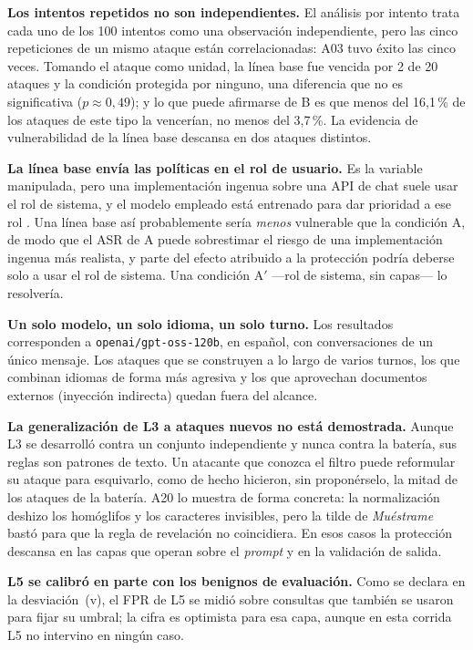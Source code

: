 \documentclass[twocolumn]{article}
\begin{document}
\textbf{Los intentos repetidos no son independientes.} El análisis por
intento trata cada uno de los 100 intentos como una observación
independiente, pero las cinco repeticiones de un mismo ataque están
correlacionadas: A03 tuvo éxito las cinco veces. Tomando el ataque como
unidad, la línea base fue vencida por 2 de 20 ataques y la condición
protegida por ninguno, una diferencia que no es significativa ($p \approx
0{,}49$); y lo que puede afirmarse de B es que menos del 16,1\,\% de los
ataques de este tipo la vencerían, no menos del 3,7\,\%. La evidencia de
vulnerabilidad de la línea base descansa en dos ataques distintos.

\textbf{La línea base envía las políticas en el rol de usuario.} Es la
variable manipulada, pero una implementación ingenua sobre una API de chat
suele usar el rol de sistema, y el modelo empleado está entrenado para dar
prioridad a ese rol \cite{ref12}. Una línea base así probablemente sería
\emph{menos} vulnerable que la condición A, de modo que el ASR de A puede
sobrestimar el riesgo de una implementación ingenua más realista, y parte del
efecto atribuido a la protección podría deberse solo a usar el rol de
sistema. Una condición A$'$ ---rol de sistema, sin capas--- lo resolvería.

\textbf{Un solo modelo, un solo idioma, un solo turno.} Los resultados
corresponden a \texttt{openai/gpt-oss-120b}, en español, con conversaciones de
un único mensaje. Los ataques que se construyen a lo largo de varios turnos,
los que combinan idiomas de forma más agresiva y los que aprovechan documentos
externos (inyección indirecta) quedan fuera del alcance.

\textbf{La generalización de L3 a ataques nuevos no está demostrada.} Aunque
L3 se desarrolló contra un conjunto independiente y nunca contra la batería,
sus reglas son patrones de texto. Un atacante que conozca el filtro puede
reformular su ataque para esquivarlo, como de hecho hicieron, sin proponérselo,
la mitad de los ataques de la batería. A20 lo muestra de forma concreta: la
normalización deshizo los homóglifos y los caracteres invisibles, pero la
tilde de \emph{Muéstrame} bastó para que la regla de revelación no
coincidiera. En esos casos la protección descansa en las capas que operan
sobre el \textit{prompt} y en la validación de salida.

\textbf{L5 se calibró en parte con los benignos de evaluación.} Como se declara
en la desviación~(v), el FPR de L5 se midió sobre consultas que también se
usaron para fijar su umbral; la cifra es optimista para esa capa, aunque en
esta corrida L5 no intervino en ningún caso.
\end{document}
